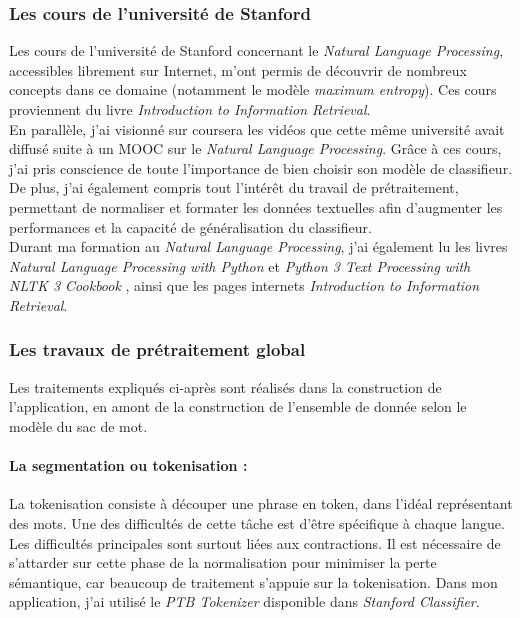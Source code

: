             \subsubsection{Les cours de l'université de Stanford}
                Les cours de l’université de Stanford concernant le \textit{Natural Language Processing}, accessibles librement sur Internet, m'ont permis de découvrir de nombreux concepts dans ce domaine (notamment le modèle \textit{maximum entropy}). Ces cours proviennent du livre \textit{Introduction to Information Retrieval}\autocite{ir_web}.\\

                En parallèle, j'ai visionné sur coursera les vidéos que cette même université avait diffusé suite à un MOOC sur le \textit{Natural Language Processing}. Grâce à ces cours, j'ai pris conscience de toute l'importance de bien choisir son modèle de classifieur. De plus, j'ai également compris tout l'intérêt du travail de prétraitement, permettant de normaliser et formater les données textuelles afin d'augmenter les performances et la capacité de généralisation du classifieur.\\

                Durant ma formation au \textit{Natural Language Processing}, j'ai également lu les livres \textit{Natural Language Processing with Python}\autocite{nlp_p} et \textit{Python 3 Text Processing with NLTK 3 Cookbook}\autocite{nltk} , ainsi que les pages internets \textit{Introduction to Information Retrieval}\autocite{ir_web}.

            \subsubsection{Les travaux de prétraitement global}
            \label{ssubsec:travaux_globaux}
                Les traitements expliqués ci-après sont réalisés dans la construction de l'application, en amont de la construction de l'ensemble de donnée selon le modèle du sac de mot.

                \paragraph{La segmentation ou tokenisation :}
                    La tokenisation consiste à découper une phrase en token, dans l'idéal représentant des mots. Une des difficultés de cette tâche est d'être spécifique à chaque langue. Les difficultés principales sont surtout liées aux contractions. Il est nécessaire de s'attarder sur cette phase de la normalisation pour minimiser la perte sémantique, car beaucoup de traitement s'appuie sur la tokenisation. Dans mon application, j'ai utilisé le \textit{PTB Tokenizer} disponible dans \textit{Stanford Classifier}.

